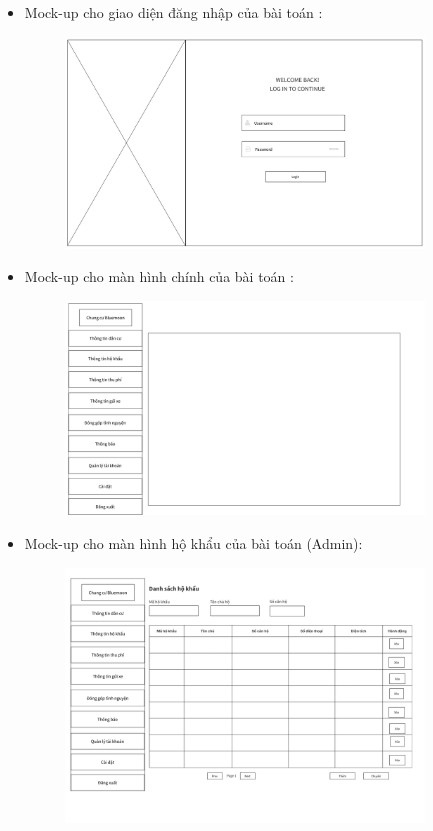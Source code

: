 \documentclass{article}
\begin{document}
\begin{itemize}
    \item Mock-up cho giao diện đăng nhập của bài toán :
    \begin{figure}[H]
        \centering
        \includegraphics[width=0.9\textwidth]{Ảnh chương 4/Màn hình đăng nhập.png}
    \end{figure}
    \newpage
    \item Mock-up cho màn hình chính của bài toán :
    \begin{figure}[H]
        \centering
        \includegraphics[width=0.9\textwidth]{Ảnh chương 4/Cập nhật dashboard.png}
    \end{figure}
    \vspace{2cm}
    \item Mock-up cho màn hình hộ khẩu của bài toán (Admin):
    \begin{figure}[H]
        \centering
        \includegraphics[width=0.9\textwidth]{Ảnh chương 4/Màn hình hộ khẩu.png}

\end{figure}
\end{itemize}
\end{document}
